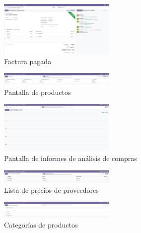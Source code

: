 \documentclass[a4paper,12pt]{article}
\begin{document}
\begin{figure}[h!]
    \centering
    \includegraphics[width=0.5\textwidth]{pr2odoo35-facturaPagada.png}
    \caption{Factura pagada}
\end{figure}
\FloatBarrier

\begin{figure}[h!]
    \centering
    \includegraphics[width=0.5\textwidth]{pr2odoo36-pantallaProductos.png}
    \caption{Pantalla de productos}
\end{figure}
\FloatBarrier

\begin{figure}[h!]
    \centering
    \includegraphics[width=0.5\textwidth]{pr2odoo37-analisisCompras.png}
    \caption{Pantalla de informes de análisis de compras}
\end{figure}
\FloatBarrier

\begin{figure}[h!]
    \centering
    \includegraphics[width=0.5\textwidth]{pr2odoo38-preciosProveedor.png}
    \caption{Lista de precios de proveedores}
\end{figure}
\FloatBarrier

\begin{figure}[h!]
    \centering
    \includegraphics[width=0.5\textwidth]{pr2odoo39-categoriasPrioductos.png}
    \caption{Categorías de productos}
\end{figure}
\FloatBarrier
\end{document}
